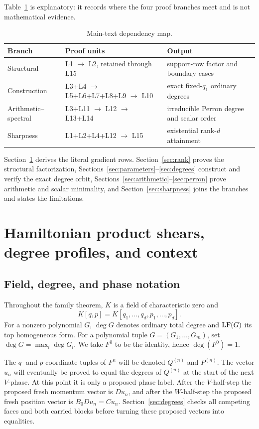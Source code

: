 \documentclass[11pt,letterpaper]{article}
\theoremstyle{plain}
\begin{document}
Table~\ref{tab:proof-map} is explanatory: it records where the four proof branches meet and is not mathematical evidence.
\begin{table}[tbp]
\centering
\small
\caption{Main-text dependency map.}
\label{tab:proof-map}
\begin{tabular}{@{}p{}p{}p{}@{}}
\toprule
Branch & Proof units & Output \\
\midrule
Structural & L1 $\rightarrow$ L2, retained through L15 & support-row factor and boundary cases \\
Construction & L3+L4 $\rightarrow$ L5+L6+L7+L8+L9 $\rightarrow$ L10 & exact fixed-$q_1$ ordinary degrees \\
Arithmetic--spectral & L3+L11 $\rightarrow$ L12 $\rightarrow$ L13+L14 & irreducible Perron degree and scalar order \\
Sharpness & L1+L2+L4+L12 $\rightarrow$ L15 & existential rank-$d$ attainment \\
\bottomrule
\end{tabular}
\end{table}
Section~\ref{sec:shears} derives the literal gradient rows.  Section~\ref{sec:rank} proves the structural factorization, Sections~\ref{sec:parameters}--\ref{sec:degrees} construct and verify the exact degree orbit, Sections~\ref{sec:arithmetic}--\ref{sec:perron} prove arithmetic and scalar minimality, and Section~\ref{sec:sharpness} joins the branches and states the limitations.

\section{Hamiltonian product shears, degree profiles, and context}
\label{sec:shears}

\subsection{Field, degree, and phase notation}

Throughout the family theorem, $K$ is a field of characteristic zero and
\[
K[q,p]=K[q_1,\ldots,q_d,p_1,\ldots,p_d].
\]
For a nonzero polynomial $G$, $\deg G$ denotes ordinary total degree and $\operatorname{LF}(G)$ its top homogeneous form.  For a polynomial tuple $G=(G_1,\ldots,G_m)$, set $\deg G=\max_i\deg G_i$.  We take $F^0$ to be the identity, hence $\deg(F^0)=1$.

The $q$- and $p$-coordinate tuples of $F^n$ will be denoted $Q^{(n)}$ and $P^{(n)}$.  The vector $u_n$ will eventually be proved to equal the degrees of $Q^{(n)}$ at the start of the next $V$-phase.  At this point it is only a proposed phase label.  After the $V$-half-step the proposed fresh momentum vector is $Du_n$, and after the $W$-half-step the proposed fresh position vector is $B_0Du_n=Cu_n$.  Section~\ref{sec:degrees} checks all competing faces and both carried blocks before turning these proposed vectors into equalities.
\end{document}

